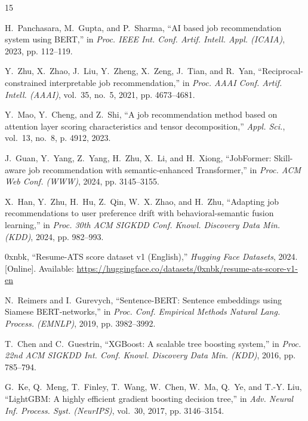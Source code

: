 \documentclass[conference]{IEEEtran}
\begin{document}
\begin{thebibliography}{15}

H.~Panchasara, M.~Gupta, and P.~Sharma, ``AI based job recommendation system using BERT,'' in \emph{Proc. IEEE Int. Conf. Artif. Intell. Appl. (ICAIA)}, 2023, pp. 112--119.

Y.~Zhu, X.~Zhao, J.~Liu, Y.~Zheng, X.~Zeng, J.~Tian, and R.~Yan, ``Reciprocal-constrained interpretable job recommendation,'' in \emph{Proc. AAAI Conf. Artif. Intell. (AAAI)}, vol.~35, no.~5, 2021, pp. 4673--4681.

Y.~Mao, Y.~Cheng, and Z.~Shi, ``A job recommendation method based on attention layer scoring characteristics and tensor decomposition,'' \emph{Appl. Sci.}, vol.~13, no.~8, p. 4912, 2023.

J.~Guan, Y.~Yang, Z.~Yang, H.~Zhu, X.~Li, and H.~Xiong, ``JobFormer: Skill-aware job recommendation with semantic-enhanced Transformer,'' in \emph{Proc. ACM Web Conf. (WWW)}, 2024, pp. 3145--3155.

X.~Han, Y.~Zhu, H.~Hu, Z.~Qin, W.~X. Zhao, and H.~Zhu, ``Adapting job recommendations to user preference drift with behavioral-semantic fusion learning,'' in \emph{Proc. 30th ACM SIGKDD Conf. Knowl. Discovery Data Min. (KDD)}, 2024, pp. 982--993.

0xnbk, ``Resume-ATS score dataset v1 (English),'' \emph{Hugging Face Datasets}, 2024. [Online]. Available: \url{https://huggingface.co/datasets/0xnbk/resume-ats-score-v1-en}

N.~Reimers and I.~Gurevych, ``Sentence-BERT: Sentence embeddings using Siamese BERT-networks,'' in \emph{Proc. Conf. Empirical Methods Natural Lang. Process. (EMNLP)}, 2019, pp. 3982--3992.

T.~Chen and C.~Guestrin, ``XGBoost: A scalable tree boosting system,'' in \emph{Proc. 22nd ACM SIGKDD Int. Conf. Knowl. Discovery Data Min. (KDD)}, 2016, pp. 785--794.

G.~Ke, Q.~Meng, T.~Finley, T.~Wang, W.~Chen, W.~Ma, Q.~Ye, and T.-Y. Liu, ``LightGBM: A highly efficient gradient boosting decision tree,'' in \emph{Adv. Neural Inf. Process. Syst. (NeurIPS)}, vol.~30, 2017, pp. 3146--3154.


\end{thebibliography}
\end{document}
